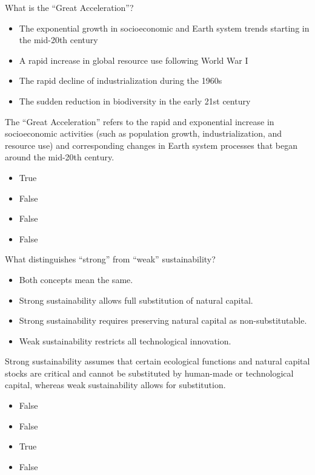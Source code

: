 \documentclass[
  a4paper,
  DIV=11,
  numbers=noendperiod,
  oneside,
  openany]{scrreprt}
\providecommand{\tightlist}{%
  \setlength{\itemsep}{0pt}\setlength{\parskip}{0pt}}
\begin{document}
What is the ``Great Acceleration''?

\begin{itemize}
\tightlist
\item[$\square$]
  The exponential growth in socioeconomic and Earth system trends
  starting in the mid-20th century
\item[$\square$]
  A rapid increase in global resource use following World War I
\item[$\square$]
  The rapid decline of industrialization during the 1960s
\item[$\square$]
  The sudden reduction in biodiversity in the early 21st century
\end{itemize}

The ``Great Acceleration'' refers to the rapid and exponential increase
in socioeconomic activities (such as population growth,
industrialization, and resource use) and corresponding changes in Earth
system processes that began around the mid-20th century.

\begin{itemize}
\tightlist
\item
  True
\item
  False
\item
  False
\item
  False
\end{itemize}

What distinguishes ``strong'' from ``weak'' sustainability?

\begin{itemize}
\tightlist
\item[$\square$]
  Both concepts mean the same.
\item[$\square$]
  Strong sustainability allows full substitution of natural capital.
\item[$\square$]
  Strong sustainability requires preserving natural capital as
  non-substitutable.
\item[$\square$]
  Weak sustainability restricts all technological innovation.
\end{itemize}

Strong sustainability assumes that certain ecological functions and
natural capital stocks are critical and cannot be substituted by
human-made or technological capital, whereas weak sustainability allows
for substitution.

\begin{itemize}
\tightlist
\item
  False
\item
  False
\item
  True
\item
  False
\end{itemize}
\end{document}
